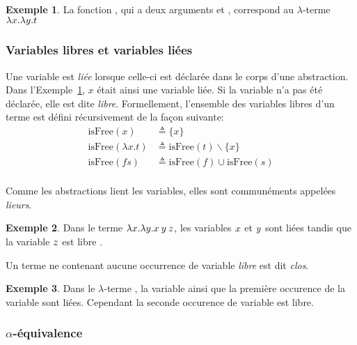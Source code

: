 \documentclass {article}
\theoremstyle{definition}
\newtheorem{example}{Exemple}
\theoremstyle{remark}
\begin{document}
\begin{example}
  \label{example:id}
  La fonction , qui a deux arguments  et ,
  correspond au $\lambda$-terme $\lambda x. \lambda y. t$
\end{example} 


\subsubsection{Variables libres et variables liées}

\newcommand{\IsFree}{\mathrm{isFree}}


Une variable est \emph{liée} lorsque celle-ci est déclarée dans le corps d'une abstraction. Dans l'Exemple~\ref{example:id}, $x$ était ainsi une variable liée.
Si la variable n'a pas été déclarée, elle est dite
\emph{libre}. Formellement, l'ensemble des variables libres d'un terme est
défini récursivement de la façon suivante:
%
\begin{align*}
  \IsFree(x) &\triangleq \{x\} \\
  \IsFree(\lambda x. t) &\triangleq \IsFree(t) \backslash \{x\} \\
  \IsFree(f s) &\triangleq \IsFree(f) \cup \IsFree(s) \\
\end{align*}

Comme les abstractions lient les variables, elles sont communéments appelées \emph{lieurs}.

\begin{example}
  Dans le terme \(\lambda x. \lambda y. x\:y\:z\),
  les variables $x$ et $y$ sont liées tandis que la variable $z$ est libre .
\end{example}


Un terme ne contenant aucune occurrence de variable \emph{libre} est dit \emph{clos}.

\begin{example}  
  \label{example:ouvert-clos}  
  Dans le $\lambda$-terme
  , la variable 
  ainsi que la première occurence de la variable  sont
  liées. Cependant la seconde occurence de variable  est
  libre.
\end{example}


\subsubsection{$\alpha$-équivalence}
\label{alpha_equiv}
\label{problemelibreliee}
\end{document}
